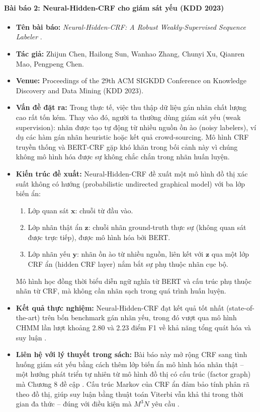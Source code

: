 \begin{expandbox}
\paragraph{Bài báo 2: Neural-Hidden-CRF cho giám sát yếu (KDD 2023)}
\begin{itemize}[leftmargin=2em]
    \item \textbf{Tên bài báo:} \textit{Neural-Hidden-CRF: A Robust Weakly-Supervised Sequence Labeler} \cite{chen2023neural_hidden_crf}.
    \item \textbf{Tác giả:} Zhijun Chen, Hailong Sun, Wanhao Zhang, Chunyi Xu, Qianren Mao, Pengpeng Chen.
    \item \textbf{Venue:} Proceedings of the 29th ACM SIGKDD Conference on Knowledge Discovery and Data Mining (KDD 2023).
    \item \textbf{Vấn đề đặt ra:} Trong thực tế, việc thu thập dữ liệu gán nhãn chất lượng cao rất tốn kém. Thay vào đó, người ta thường dùng giám sát yếu (weak supervision): nhãn được tạo tự động từ nhiều nguồn ồn ào (noisy labelers), ví dụ các hàm gán nhãn heuristic hoặc kết quả crowd-sourcing. Mô hình CRF truyền thống và BERT-CRF gặp khó khăn trong bối cảnh này vì chúng không mô hình hóa được sự không chắc chắn trong nhãn huấn luyện.
    \item \textbf{Kiến trúc đề xuất:} Neural-Hidden-CRF đề xuất một mô hình đồ thị xác suất không có hướng (probabilistic undirected graphical model) với ba lớp biến ẩn:
    \begin{enumerate}
        \item Lớp quan sát $\bm{x}$: chuỗi từ đầu vào.
        \item Lớp nhãn thật ẩn $\bm{z}$: chuỗi nhãn ground-truth thực sự (không quan sát được trực tiếp), được mô hình hóa bởi BERT.
        \item Lớp nhãn yếu $\bm{y}$: nhãn ồn ào từ nhiều nguồn, liên kết với $\bm{z}$ qua một lớp CRF ẩn (hidden CRF layer) nắm bắt sự phụ thuộc nhãn cục bộ.
    \end{enumerate}
    Mô hình học đồng thời biểu diễn ngữ nghĩa từ BERT và cấu trúc phụ thuộc nhãn từ CRF, mà không cần nhãn sạch trong quá trình huấn luyện.
    \item \textbf{Kết quả thực nghiệm:} Neural-Hidden-CRF đạt kết quả tốt nhất (state-of-the-art) trên bốn benchmark gán nhãn yếu, trong đó vượt qua mô hình CHMM lần lượt khoảng 2.80 và 2.23 điểm F1 về khả năng tổng quát hóa và suy luận \cite{chen2023neural_hidden_crf}.
    \item \textbf{Liên hệ với lý thuyết trong sách:} Bài báo này mở rộng CRF sang tình huống giám sát yếu bằng cách thêm lớp biến ẩn mô hình hóa nhãn thật -- một hướng phát triển tự nhiên từ mô hình đồ thị có cấu trúc (factor graph) mà Chương 8 đề cập \cite{mohri2018foundations}. Cấu trúc Markov của CRF ẩn đảm bảo tính phân rã theo đồ thị, giúp suy luận bằng thuật toán Viterbi vẫn khả thi trong thời gian đa thức -- đúng với điều kiện mà $M^3N$ yêu cầu \cite{mohri2018foundations}.
\end{itemize}


\end{expandbox}
